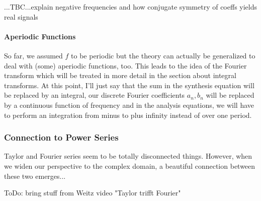 ...TBC...explain negative frequencies and how conjugate symmetry of coeffs yields real signals


\paragraph{Aperiodic Functions}
So far, we assumed $f$ to be periodic but the theory can actually be generalized to deal with (some) aperiodic functions, too. This leads to the idea of the Fourier transform which will be treated in more detail in the section about integral transforms. At this point, I'll just say that the sum in the synthesis equation will be replaced by an integral, our discrete Fourier coefficients $a_n, b_n$ will be replaced by a continuous function of frequency and in the analysis equations, we will have to perform an integration from minus to plus infinity instead of over one period. 




\subsubsection{Connection to Power Series}
Taylor and Fourier series seem to be totally disconnected things. However, when we widen our perspective to the complex domain, a beautiful connection between these two emerges...

\medskip
ToDo: bring stuff from Weitz video "Taylor trifft Fourier"


